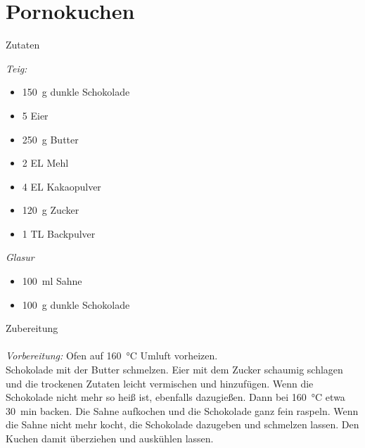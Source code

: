 \section*{Pornokuchen}
\ihead{}\ohead{}
\cfoot{}
{\Large Zutaten}
\begin{multicols}{2}
\textit{Teig:}
\begin{itemize}
    \item \SI{150}{g} dunkle Schokolade
    \item \num{5} Eier
    \item \SI{250}{g} Butter
    \item \num{2} EL Mehl
    \item \num{4} EL Kakaopulver
    \item \SI{120}{g} Zucker
    \item \num{1} TL Backpulver
\end{itemize}
\textit{Glasur}
\begin{itemize}
    \item \SI{100}{ml} Sahne
    \item \SI{100}{g} dunkle Schokolade
\end{itemize}
\end{multicols}
\noindent
{\Large Zubereitung}\\
\\
\textit{Vorbereitung:} Ofen auf \SI{160}{\celsius} Umluft vorheizen.\\
Schokolade mit der Butter schmelzen.
Eier mit dem Zucker schaumig schlagen und die trockenen Zutaten leicht vermischen und hinzufügen. 
Wenn die Schokolade nicht mehr so heiß ist, ebenfalls dazugießen.
Dann bei \SI{160}{\celsius} etwa \SI{30}{min} backen.
Die Sahne aufkochen und die Schokolade ganz fein raspeln. 
Wenn die Sahne nicht mehr kocht, die Schokolade dazugeben und schmelzen lassen. 
Den Kuchen damit überziehen und auskühlen lassen.